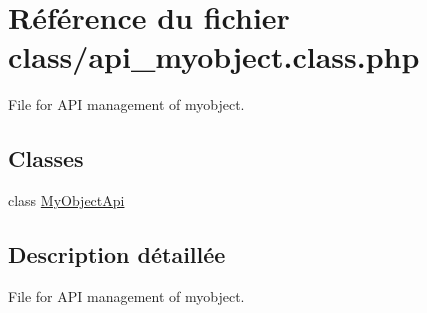 \hypertarget{api__myobject_8class_8php}{}\section{Référence du fichier class/api\+\_\+myobject.class.\+php}
\label{api__myobject_8class_8php}


File for A\+PI management of myobject.  


\subsection*{Classes}
\begin{DoxyCompactItemize}
\item 
class \hyperlink{classMyObjectApi}{My\+Object\+Api}
\end{DoxyCompactItemize}


\subsection{Description détaillée}
File for A\+PI management of myobject. 

